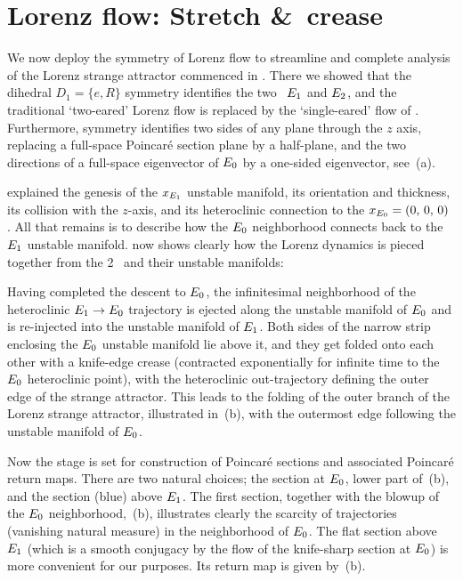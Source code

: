 \section{Lorenz flow: Stretch \&\ crease\label{exmp:LorenzRetM}}
We now deploy the symmetry of Lorenz flow
to streamline and complete analysis of the Lorenz strange attractor
commenced in  . There we showed that
the dihedral $D_1 = \{e,R\}$ symmetry identifies the
two \eqva\ $E_{1}$ and $E_{2}$,
and the traditional `two-eared' Lorenz flow
 is replaced by
the `single-eared' flow
of .
Furthermore, symmetry identifies two sides of any plane
through the $z$ axis, replacing a full-space Poincar\'e
section plane by a half-plane, and the two directions
of a full-space eigen\-vector of $E_{0}$
 by a one-sided eigen\-vector, see \,(a).

 explained the genesis of the
$x_{E_{1}}$ {\eqv} unstable manifold, its orientation and
thickness, its collision with the $z$-axis, and its
heteroclinic connection to the $x_{E_{0}} = (0,\, 0,\, 0)$
{\eqv}. All that remains is to describe how the $E_{0}$
neighborhood connects back to the $E_{1}$ unstable
manifold.  now shows clearly how the
Lorenz dynamics is pieced together from the 2 \eqva\ and their
unstable manifolds:

Having completed the descent to  $E_{0}$, the
infinitesimal neighborhood of the heteroclinic $E_{1} \to
E_{0}$ trajectory is ejected along the unstable manifold
of $E_{0}$ and is re-injected into the unstable manifold
of $E_{1}$. Both sides of the narrow strip enclosing the
$E_{0}$ unstable manifold  lie above it, and they get
folded onto each other with a knife-edge crease (contracted
exponentially for infinite time to the  $E_{0}$
heteroclinic point), with the heteroclinic out-trajectory
defining the outer edge of the strange attractor. This leads to
the folding of the outer branch of the Lorenz strange
attractor, illustrated in \,(b), with
the outermost edge following the unstable manifold of
$E_{0}$.

Now the stage is set for construction of  Poincar\'e sections
and associated  Poincar\'e return maps. There are two natural
choices; the section at $E_{0}$, lower part of
\,(b), and the section (blue) above
$E_{1}$. The first section, together with the blowup of
the $E_{0}$ neighborhood, \,(b),
illustrates clearly the scarcity of trajectories (vanishing
natural measure) in the neighborhood of $E_{0}$. The flat
section above $E_{1}$ (which is a
smooth conjugacy by the flow of the knife-sharp section at
$E_{0}$) is more convenient for our purposes. Its return
map is given by \,(b).

